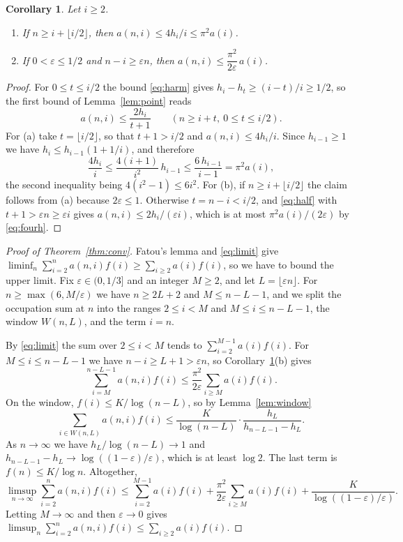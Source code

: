 \documentclass[11pt]{amsart}
\newtheorem{corollary}[theorem]{Corollary}
\theoremstyle{remark}
\numberwithin{equation}{section}
\begin{document}
\begin{corollary}\label{cor:point}
Let $i\ge2$.
\begin{enumerate}
\item[(a)] If $n\ge i+\lfloor i/2\rfloor$, then $a(n,i)\le4h_i/i\le\pi^2a(i)$.
\item[(b)] If $0<\varepsilon\le1/2$ and $n-i\ge\varepsilon n$, then $a(n,i)\le\dfrac{\pi^2}{2\varepsilon}\,a(i)$.
\end{enumerate}
\end{corollary}

\begin{proof}
For $0\le t\le i/2$ the bound \eqref{eq:harm} gives $h_i-h_t\ge(i-t)/i\ge1/2$, so the first bound of
Lemma~\ref{lem:point} reads
\begin{equation}\label{eq:half}
a(n,i)\le\frac{2h_i}{t+1}\qquad(n\ge i+t,\ 0\le t\le i/2).
\end{equation}
For (a) take $t=\lfloor i/2\rfloor$, so that $t+1>i/2$ and $a(n,i)\le4h_i/i$. Since $h_{i-1}\ge1$ we have
$h_i\le h_{i-1}(1+1/i)$, and therefore
\begin{equation}\label{eq:fourh}
\frac{4h_i}{i}\le\frac{4(i+1)}{i^2}\,h_{i-1}\le\frac{6\,h_{i-1}}{i-1}=\pi^2a(i),
\end{equation}
the second inequality being $4(i^2-1)\le6i^2$. For (b), if $n\ge i+\lfloor i/2\rfloor$ the claim follows from (a) because
$2\varepsilon\le1$. Otherwise $t=n-i<i/2$, and \eqref{eq:half} with $t+1>\varepsilon n\ge\varepsilon i$ gives
$a(n,i)\le2h_i/(\varepsilon i)$, which is at most $\pi^2a(i)/(2\varepsilon)$ by \eqref{eq:fourh}.
\end{proof}

\begin{proof}[Proof of Theorem~\ref{thm:conv}]
Fatou's lemma and \eqref{eq:limit} give $\liminf_n\sum_{i=2}^na(n,i)f(i)\ge\sum_{i\ge2}a(i)f(i)$, so we have to bound
the upper limit. Fix $\varepsilon\in(0,1/3]$ and an integer $M\ge2$, and let $L=\lfloor\varepsilon n\rfloor$. For
$n\ge\max(6,M/\varepsilon)$ we have $n\ge2L+2$ and $M\le n-L-1$, and we split the occupation sum at $n$ into the
ranges $2\le i<M$ and $M\le i\le n-L-1$, the window $W(n,L)$, and the term $i=n$.

By \eqref{eq:limit} the sum over $2\le i<M$ tends to $\sum_{i=2}^{M-1}a(i)f(i)$. For $M\le i\le n-L-1$ we have
$n-i\ge L+1>\varepsilon n$, so Corollary~\ref{cor:point}(b) gives
\[
\sum_{i=M}^{n-L-1}a(n,i)f(i)\le\frac{\pi^2}{2\varepsilon}\sum_{i\ge M}a(i)f(i).
\]
On the window, $f(i)\le K/\log(n-L)$, so by Lemma~\ref{lem:window}
\[
\sum_{i\in W(n,L)}a(n,i)f(i)\le\frac{K}{\log(n-L)}\cdot\frac{h_L}{h_{n-L-1}-h_L}.
\]
As $n\to\infty$ we have $h_L/\log(n-L)\to1$ and $h_{n-L-1}-h_L\to\log((1-\varepsilon)/\varepsilon)$, which is at least
$\log2$. The last term is $f(n)\le K/\log n$. Altogether,
\[
\limsup_{n\to\infty}\sum_{i=2}^{n}a(n,i)f(i)\le\sum_{i=2}^{M-1}a(i)f(i)+\frac{\pi^2}{2\varepsilon}\sum_{i\ge M}a(i)f(i)
+\frac{K}{\log((1-\varepsilon)/\varepsilon)}.
\]
Letting $M\to\infty$ and then $\varepsilon\to0$ gives $\limsup_n\sum_{i=2}^na(n,i)f(i)\le\sum_{i\ge2}a(i)f(i)$.
\end{proof}
\end{document}
